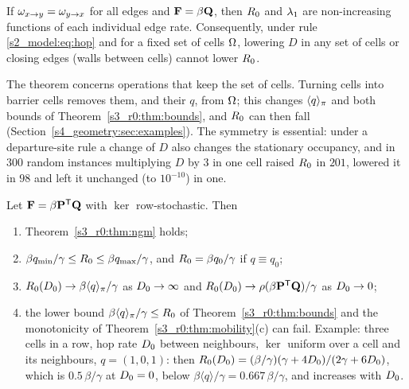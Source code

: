 \begin{theorem}\label{s3_r0:thm:edges}
  If $\omega_{x\to y}=\omega_{y\to x}$ for all edges and $\mathbf{F}=\beta\mathbf{Q}$, then $R_0$ and $\lambda_1$ are non-increasing
  functions of each individual edge rate.  Consequently, under rule \eqref{s2_model:eq:hop} and for a fixed set
  of cells $\Omega$, lowering $D$ in any set of cells or closing edges (walls between cells) cannot lower $R_0$.
\end{theorem}

The theorem concerns operations that keep the set of cells. Turning cells into barrier cells removes them, and
their $q$, from $\Omega$; this changes $\langle q\rangle_{\pi}$ and both bounds of Theorem~\ref{s3_r0:thm:bounds}, and $R_0$ can
then fall (Section~\ref{s4_geometry:sec:examples}). The symmetry is essential: under a departure-site rule a
change of $D$ also changes the stationary occupancy, and in $300$ random instances multiplying $D$ by $3$ in
one cell raised $R_0$ in $201$, lowered it in $98$ and left it unchanged (to $10^{-10}$) in one.

\begin{proposition}\label{s3_r0:prop:kernel}
  Let $\mathbf{F}=\beta\mathbf{P}^{\mathsf{T}}\mathbf{Q}$ with $\ker$ row-stochastic.  Then
  \begin{enumerate}[label=\textup{(\roman*)},leftmargin=*]
    \item Theorem~\ref{s3_r0:thm:ngm} holds;
    \item $\beta q_{\min}/\gamma\le R_0\le\beta q_{\max}/\gamma$, and $R_0=\beta q_0/\gamma$ if $q\equiv q_0$;
    \item $R_0(D_0)\to\beta\langle q\rangle_{\pi}/\gamma$ as $D_0\to\infty$ and $R_0(D_0)\to\rho(\beta\mathbf{P}^{\mathsf{T}}\mathbf{Q})/\gamma$ as $D_0\to0$;
    \item the lower bound $\beta\langle q\rangle_{\pi}/\gamma\le R_0$ of Theorem~\ref{s3_r0:thm:bounds} and the monotonicity of
      Theorem~\ref{s3_r0:thm:mobility}(c) can fail.  Example: three cells in a row, hop rate $D_0$ between neighbours,
      $\ker$ uniform over a cell and its neighbours, $q=(1,0,1)$: then
      $R_0(D_0)=(\beta/\gamma)(\gamma+4D_0)/(2\gamma+6D_0)$, which is $0.5\,\beta/\gamma$ at $D_0=0$,
      below $\beta\langle q\rangle/\gamma=0.667\,\beta/\gamma$, and increases with $D_0$.
  \end{enumerate}
\end{proposition}

